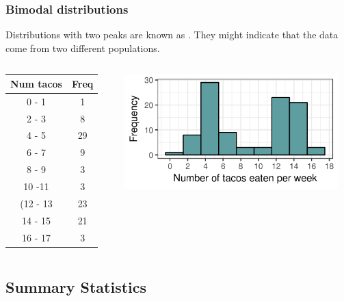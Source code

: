 \documentclass[xcolor=table, aspectratio=169, bigger, handout]{beamer}
\begin{document}
\begin{frame}
\frametitle{Bimodal distributions}
\begin{block}{}
Distributions with two peaks are known as . They might indicate that the data come from two different populations.
\end{block}
\pause
\begin{columns}
\begin{column}{0.35\textwidth}
\begin{exampleblock}{}
\begin{center}
\begin{tabular}{cc}
Num tacos & Freq \\
\hline
0 - 1 & 1 \\
2 - 3 & 8 \\
4 - 5 & 29 \\
6 - 7 & 9 \\
8 - 9 & 3 \\
10 -11 & 3 \\
(12 - 13 & 23 \\
14 - 15 & 21 \\
16 - 17 & 3 \\
\end{tabular}
\end{center}
\end{exampleblock}
\end{column}
\pause
\begin{column}{0.65\textwidth}
\begin{center}
\includegraphics[width=3.25in]{../images/wk04_taco_bi_hist}

\end{center}
\end{column}
\end{columns}
\end{frame}








% 
%
\subsection{Summary Statistics}
\end{document}
